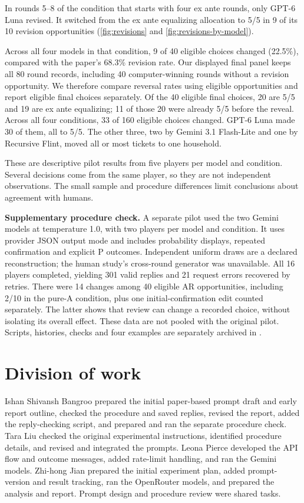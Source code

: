 \documentclass[12pt,letterpaper]{article}
\begin{document}
In rounds 5--8 of the condition that starts with four ex ante rounds, only GPT-6 Luna revised. It switched from the ex ante equalizing allocation to 5/5 in 9 of its 10 revision opportunities (\autoref{fig:revisions} and \autoref{fig:revisions-by-model}).

Across all four models in that condition, 9 of 40 eligible choices changed (22.5\%), compared with the paper's 68.3\% revision rate. Our displayed final panel keeps all 80 round records, including 40 computer-winning rounds without a revision opportunity. We therefore compare reversal rates using eligible opportunities and report eligible final choices separately. Of the 40 eligible final choices, 20 are 5/5 and 19 are ex ante equalizing; 11 of those 20 were already 5/5 before the reveal. Across all four conditions, 33 of 160 eligible choices changed. GPT-6 Luna made 30 of them, all to 5/5. The other three, two by Gemini 3.1 Flash-Lite and one by Recursive Flint, moved all or most tickets to one household.

These are descriptive pilot results from five players per model and condition. Several decisions come from the same player, so they are not independent observations. The small sample and procedure differences limit conclusions about agreement with humans.

\noindent\textbf{Supplementary procedure check.} A separate pilot used the two Gemini models at temperature 1.0, with two players per model and condition. It uses provider JSON output mode and includes probability displays, repeated confirmation and explicit P outcomes. Independent uniform draws are a declared reconstruction; the human study's cross-round generator was unavailable. All 16 players completed, yielding 301 valid replies and 21 request errors recovered by retries. There were 14 changes among 40 eligible AR opportunities, including 2/10 in the pure-A condition, plus one initial-confirmation edit counted separately. The latter shows that review can change a recorded choice, without isolating its overall effect. These data are not pooled with the original pilot. Scripts, histories, checks and four examples are separately archived in .

\section{Division of work}
Ishan Shivansh Bangroo prepared the initial paper-based prompt draft and early report outline, checked the procedure and saved replies, revised the report, added the reply-checking script, and prepared and ran the separate procedure check. Tara Liu checked the original experimental instructions, identified procedure details, and revised and integrated the prompts. Leona Pierce developed the API flow and outcome messages, added rate-limit handling, and ran the Gemini models. Zhi-hong Jian prepared the initial experiment plan, added prompt-version and result tracking, ran the OpenRouter models, and prepared the analysis and report. Prompt design and procedure review were shared tasks.
\end{document}

